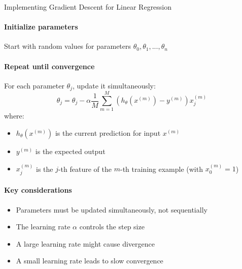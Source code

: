 \begin{KR}{Implementing Gradient Descent for Linear Regression}\\
\paragraph{Initialize parameters}
Start with random values for parameters $\theta_0, \theta_1, ..., \theta_n$

\paragraph{Repeat until convergence}
For each parameter $\theta_j$, update it simultaneously:
\[\theta_j = \theta_j - \alpha \frac{1}{M}\sum_{m=1}^{M}(h_\theta(x^{(m)}) - y^{(m)})x^{(m)}_j\]
where:
\begin{itemize}
    \item $h_\theta(x^{(m)})$ is the current prediction for input $x^{(m)}$
    \item $y^{(m)}$ is the expected output
    \item $x^{(m)}_j$ is the $j$-th feature of the $m$-th training example (with $x^{(m)}_0 = 1$)
\end{itemize}

\paragraph{Key considerations}
\begin{itemize}
    \item Parameters must be updated simultaneously, not sequentially
    \item The learning rate $\alpha$ controls the step size
    \item A large learning rate might cause divergence
    \item A small learning rate leads to slow convergence
\end{itemize}
\end{KR}

